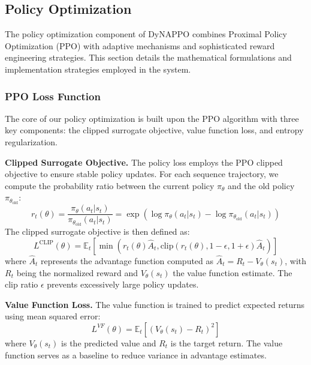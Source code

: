 \subsection{Policy Optimization}

The policy optimization component of DyNAPPO combines Proximal Policy Optimization (PPO) with adaptive mechanisms and sophisticated reward engineering strategies. This section details the mathematical formulations and implementation strategies employed in the system.

\subsubsection{PPO Loss Function}

The core of our policy optimization is built upon the PPO algorithm with three key components: the clipped surrogate objective, value function loss, and entropy regularization.

\textbf{Clipped Surrogate Objective.} The policy loss employs the PPO clipped objective to ensure stable policy updates. For each sequence trajectory, we compute the probability ratio between the current policy $\pi_{\theta}$ and the old policy $\pi_{\theta_{\text{old}}}$:
%
\begin{equation}
r_t(\theta) = \frac{\pi_{\theta}(a_t|s_t)}{\pi_{\theta_{\text{old}}}(a_t|s_t)} = \exp(\log \pi_{\theta}(a_t|s_t) - \log \pi_{\theta_{\text{old}}}(a_t|s_t))
\end{equation}
%
The clipped surrogate objective is then defined as:
%
\begin{equation}
L^{\text{CLIP}}(\theta) = \mathbb{E}_t\left[\min\left(r_t(\theta)\hat{A}_t, \text{clip}(r_t(\theta), 1-\epsilon, 1+\epsilon)\hat{A}_t\right)\right]
\end{equation}
%
where $\hat{A}_t$ represents the advantage function computed as $\hat{A}_t = R_t - V_{\theta}(s_t)$, with $R_t$ being the normalized reward and $V_{\theta}(s_t)$ the value function estimate. The clip ratio $\epsilon$ prevents excessively large policy updates.

\textbf{Value Function Loss.} The value function is trained to predict expected returns using mean squared error:
%
\begin{equation}
L^{VF}(\theta) = \mathbb{E}_t\left[\left(V_{\theta}(s_t) - R_t\right)^2\right]
\end{equation}
%
where $V_{\theta}(s_t)$ is the predicted value and $R_t$ is the target return. The value function serves as a baseline to reduce variance in advantage estimates.


